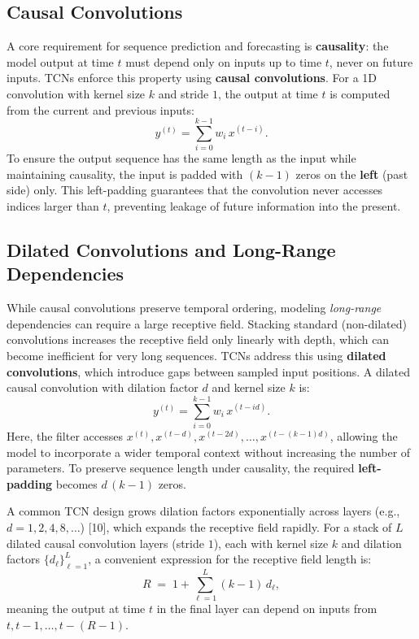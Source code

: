 \documentclass{article}
\renewcommand{\cite}[1]{[#1]}
\begin{document}
\subsection{Causal Convolutions}

A core requirement for sequence prediction and forecasting is \textbf{causality}: the model output at time $t$ must depend only on inputs up to time $t$, never on future inputs. TCNs enforce this property using \textbf{causal convolutions}. For a 1D convolution with kernel size $k$ and stride $1$, the output at time $t$ is computed from the current and previous inputs:
\[
y^{(t)} = \sum_{i=0}^{k-1} w_i \, x^{(t-i)}.
\]
To ensure the output sequence has the same length as the input while maintaining causality, the input is padded with $(k-1)$ zeros on the \textbf{left} (past side) only. This left-padding guarantees that the convolution never accesses indices larger than $t$, preventing leakage of future information into the present.

\subsection{Dilated Convolutions and Long-Range Dependencies}

While causal convolutions preserve temporal ordering, modeling \emph{long-range} dependencies can require a large receptive field. Stacking standard (non-dilated) convolutions increases the receptive field only linearly with depth, which can become inefficient for very long sequences. TCNs address this using \textbf{dilated convolutions}, which introduce gaps between sampled input positions. A dilated causal convolution with dilation factor $d$ and kernel size $k$ is:
\[
y^{(t)} = \sum_{i=0}^{k-1} w_i \, x^{(t-i d)}.
\]
Here, the filter accesses $x^{(t)}, x^{(t-d)}, x^{(t-2d)}, \dots, x^{(t-(k-1)d)}$, allowing the model to incorporate a wider temporal context without increasing the number of parameters. To preserve sequence length under causality, the required \textbf{left-padding} becomes $d\,(k-1)$ zeros.

A common TCN design grows dilation factors exponentially across layers (e.g., $d=1,2,4,8,\dots$) \cite{10}, which expands the receptive field rapidly. For a stack of $L$ dilated causal convolution layers (stride $1$), each with kernel size $k$ and dilation factors $\{d_\ell\}_{\ell=1}^L$, a convenient expression for the receptive field length is:
\[
R \;=\; 1 + \sum_{\ell=1}^{L} (k-1)\,d_\ell,
\]
meaning the output at time $t$ in the final layer can depend on inputs from $t, t-1, \dots, t-(R-1)$.
\end{document}
